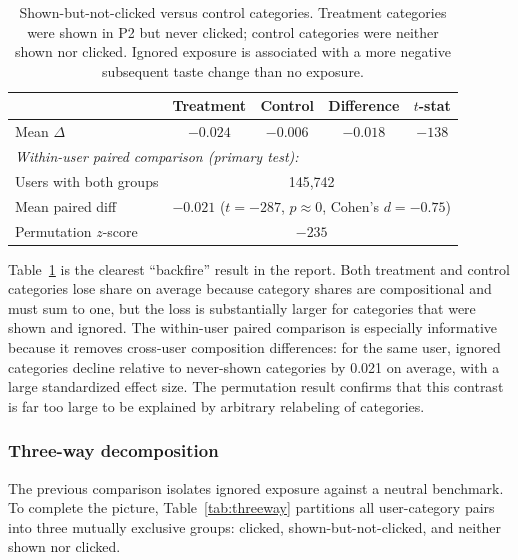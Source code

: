 \documentclass[11pt]{article}
\begin{document}
\begin{table}[ht]
\centering
\caption{Shown-but-not-clicked versus control categories. Treatment categories were shown in P2 but never clicked; control categories were neither shown nor clicked. Ignored exposure is associated with a more negative subsequent taste change than no exposure.}
\label{tab:backfire}
\begin{tabular}{lcccc}
\toprule
 & Treatment & Control & Difference & $t$-stat \\
\midrule
Mean $\Delta$ & $-0.024$ & $-0.006$ & $-0.018$ & $-138$ \\
\midrule
\multicolumn{5}{l}{\textit{Within-user paired comparison (primary test):}} \\
Users with both groups & \multicolumn{4}{c}{145,742} \\
Mean paired diff & \multicolumn{4}{c}{$-0.021$ ($t = -287$, $p \approx 0$, Cohen's $d = -0.75$)} \\
Permutation $z$-score & \multicolumn{4}{c}{$-235$} \\
\bottomrule
\end{tabular}
\end{table}
\FloatBarrier

Table~\ref{tab:backfire} is the clearest ``backfire'' result in the report. Both treatment and control categories lose share on average because category shares are compositional and must sum to one, but the loss is substantially larger for categories that were shown and ignored. The within-user paired comparison is especially informative because it removes cross-user composition differences: for the same user, ignored categories decline relative to never-shown categories by 0.021 on average, with a large standardized effect size. The permutation result confirms that this contrast is far too large to be explained by arbitrary relabeling of categories.

\subsubsection{Three-way decomposition}

The previous comparison isolates ignored exposure against a neutral benchmark. To complete the picture, Table~\ref{tab:threeway} partitions all user-category pairs into three mutually exclusive groups: clicked, shown-but-not-clicked, and neither shown nor clicked.
\end{document}

